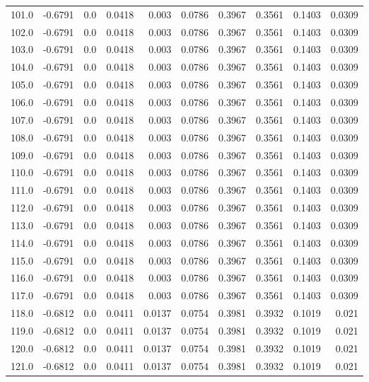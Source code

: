 \begin{longtable}{lrrrrrrrrr}
101.0 & -0.6791 & 0.0 & 0.0418 & 0.003 & 0.0786 & 0.3967 & 0.3561 & 0.1403 & 0.0309 \\
102.0 & -0.6791 & 0.0 & 0.0418 & 0.003 & 0.0786 & 0.3967 & 0.3561 & 0.1403 & 0.0309 \\
103.0 & -0.6791 & 0.0 & 0.0418 & 0.003 & 0.0786 & 0.3967 & 0.3561 & 0.1403 & 0.0309 \\
104.0 & -0.6791 & 0.0 & 0.0418 & 0.003 & 0.0786 & 0.3967 & 0.3561 & 0.1403 & 0.0309 \\
105.0 & -0.6791 & 0.0 & 0.0418 & 0.003 & 0.0786 & 0.3967 & 0.3561 & 0.1403 & 0.0309 \\
106.0 & -0.6791 & 0.0 & 0.0418 & 0.003 & 0.0786 & 0.3967 & 0.3561 & 0.1403 & 0.0309 \\
107.0 & -0.6791 & 0.0 & 0.0418 & 0.003 & 0.0786 & 0.3967 & 0.3561 & 0.1403 & 0.0309 \\
108.0 & -0.6791 & 0.0 & 0.0418 & 0.003 & 0.0786 & 0.3967 & 0.3561 & 0.1403 & 0.0309 \\
109.0 & -0.6791 & 0.0 & 0.0418 & 0.003 & 0.0786 & 0.3967 & 0.3561 & 0.1403 & 0.0309 \\
110.0 & -0.6791 & 0.0 & 0.0418 & 0.003 & 0.0786 & 0.3967 & 0.3561 & 0.1403 & 0.0309 \\
111.0 & -0.6791 & 0.0 & 0.0418 & 0.003 & 0.0786 & 0.3967 & 0.3561 & 0.1403 & 0.0309 \\
112.0 & -0.6791 & 0.0 & 0.0418 & 0.003 & 0.0786 & 0.3967 & 0.3561 & 0.1403 & 0.0309 \\
113.0 & -0.6791 & 0.0 & 0.0418 & 0.003 & 0.0786 & 0.3967 & 0.3561 & 0.1403 & 0.0309 \\
114.0 & -0.6791 & 0.0 & 0.0418 & 0.003 & 0.0786 & 0.3967 & 0.3561 & 0.1403 & 0.0309 \\
115.0 & -0.6791 & 0.0 & 0.0418 & 0.003 & 0.0786 & 0.3967 & 0.3561 & 0.1403 & 0.0309 \\
116.0 & -0.6791 & 0.0 & 0.0418 & 0.003 & 0.0786 & 0.3967 & 0.3561 & 0.1403 & 0.0309 \\
117.0 & -0.6791 & 0.0 & 0.0418 & 0.003 & 0.0786 & 0.3967 & 0.3561 & 0.1403 & 0.0309 \\
118.0 & -0.6812 & 0.0 & 0.0411 & 0.0137 & 0.0754 & 0.3981 & 0.3932 & 0.1019 & 0.021 \\
119.0 & -0.6812 & 0.0 & 0.0411 & 0.0137 & 0.0754 & 0.3981 & 0.3932 & 0.1019 & 0.021 \\
120.0 & -0.6812 & 0.0 & 0.0411 & 0.0137 & 0.0754 & 0.3981 & 0.3932 & 0.1019 & 0.021 \\
121.0 & -0.6812 & 0.0 & 0.0411 & 0.0137 & 0.0754 & 0.3981 & 0.3932 & 0.1019 & 0.021 \\

\end{longtable}
